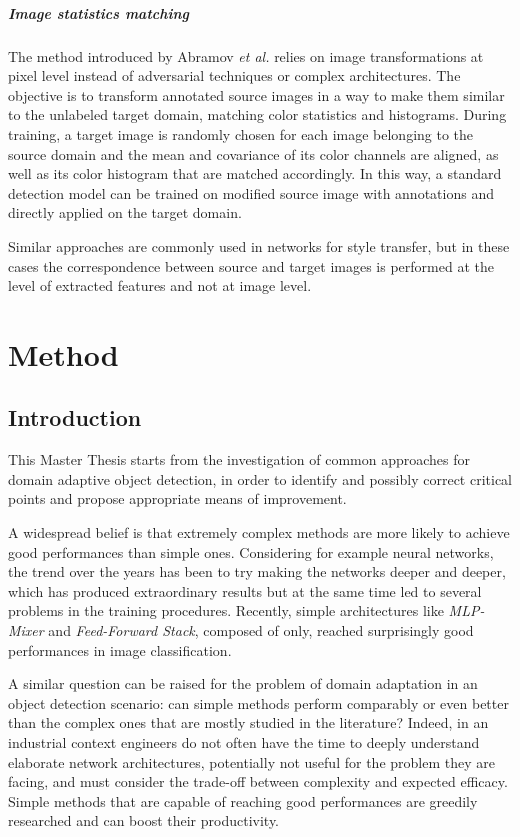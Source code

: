 \documentclass[%
    corpo=12pt,
    twoside,
    stile=classica,   
    tipotesi=magistrale,
    evenboxes,
    english,
	numerazioneromana,
]{toptesi}
\begin{document}
\paragraph{Image statistics matching}\label{sec:kis}
The method introduced by Abramov \emph{et al.}\cite{abramov2020simple} relies on image transformations at pixel level instead of adversarial techniques or complex architectures. The objective is to transform annotated source images in a way to make them similar to the unlabeled target domain, matching color statistics and histograms. During training, a target image is randomly chosen for each image belonging to the source domain and the mean and covariance of its color channels are aligned, as well as its color histogram that are matched accordingly. In this way, a standard detection model can be trained on modified source image with annotations and directly applied on the target domain.

Similar approaches are commonly used in networks for style transfer, but in these cases the correspondence between source and target images is performed at the level of extracted features and not at image level.



\chapter{Method}
\section{Introduction}
This Master Thesis starts from the investigation of common approaches for domain adaptive object detection, in order to identify and possibly correct critical points and propose appropriate means of improvement.

\bigskip
A widespread belief is that extremely complex methods are more likely to achieve good performances than simple ones. Considering for example neural networks, the trend over the years has been to try making the networks deeper and deeper, which has produced extraordinary results but at the same time led to several problems in the training procedures. Recently, simple architectures like \textit{MLP-Mixer}\cite{tolstikhin2021mlpmixer} and \textit{Feed-Forward Stack}\cite{melaskyriazi2021need}, composed of  only, reached surprisingly good performances in image classification.

A similar question can be raised for the problem of domain adaptation in an object detection scenario: can simple methods perform comparably or even better than the complex ones that are mostly studied in the literature? Indeed, in an industrial context engineers do not often have the time to deeply understand elaborate network architectures, potentially not useful for the problem they are facing, and must consider the trade-off between complexity and expected efficacy. Simple methods that are capable of reaching good performances are greedily researched and can boost their productivity.
\end{document}
